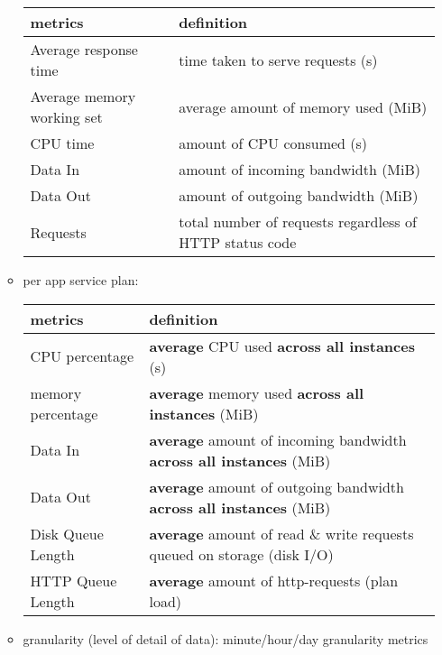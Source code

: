 \begin{itemize}
\begin{itemize}
		\begin{table}[H]
			\begin{center}
				\begin{tabular}{|l|p{7cm}|}
					\hline
					metrics  &definition \\ \hline
					Average response time        & time taken to serve requests (s)  \\ \hline
					Average memory working set     & average amount of memory used (MiB)    \\ \hline
					CPU time      & amount of CPU consumed (s)    \\ \hline
					Data In  & amount of incoming bandwidth (MiB)    \\ \hline
					Data Out  & amount of outgoing bandwidth (MiB)    \\ \hline
					Requests  & total number of requests regardless of HTTP status code    \\ \hline
				\end{tabular}
			\end{center}
		\end{table}
		
		\item per app service plan:
		\begin{table}[H]
			\begin{center}
				\begin{tabular}{|l|p{9cm}|}
					\hline
					metrics  &definition \\ \hline
					CPU percentage        & \textbf{average} CPU used \textbf{across all instances} (s)  \\ \hline
					memory percentage     & \textbf{average} memory used \textbf{across all instances} (MiB)    \\ \hline
					Data In  & \textbf{average} amount of incoming bandwidth \textbf{across all instances} (MiB)    \\ \hline
					Data Out  & \textbf{average} amount of outgoing bandwidth \textbf{across all instances} (MiB)    \\ \hline
					Disk Queue Length  & \textbf{average} amount of read \& write requests queued on storage (disk I/O)    \\ \hline
					HTTP Queue Length  & \textbf{average} amount of http-requests (plan load) \\ \hline
				\end{tabular}
			\end{center}
		\end{table}
		\item granularity (level of detail of data): minute/hour/day granularity metrics
	\end{itemize}
\end{itemize}


